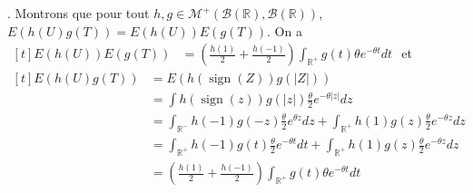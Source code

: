 \documentclass{report}
\DeclareMathOperator{\sign}{sign}
\begin{document}
\newline {}. Montrons que pour tout $h,g\in \mathcal M^+(\mathcal B(\mathbb R),\mathcal B(\mathbb R))$,  $E(h(U)g(T))=E(h(U))E(g(T))$.\newline
On a $\begin{aligned}[t]
E(h(U))E(g(T)) &= \left(\frac{h(1)}{2} + \frac{h(-1)}{2} \right) \int_{\mathbb R^+} g(t) \theta e^{-\theta t} dt
\end{aligned}$ \newline \newline
et $\begin{aligned}[t]
E(h(U)g(T)) &= E(h(\sign(Z))g(|Z|)) \\ 
&= \int h(\sign(z))g(|z|) \frac{\theta}{2}e^{-\theta |z|} dz \\
&= \int_{\mathbb R^-}h(-1)g(-z)\frac{\theta}{2}e^{\theta z} dz + \int_{\mathbb R^+}h(1)g(z)\frac{\theta}{2}e^{-\theta z} dz \\
&= \int_{\mathbb R^+}h(-1)g(t)\frac{\theta}{2}e^{-\theta t} dt + \int_{\mathbb R^+}h(1)g(z)\frac{\theta}{2}e^{-\theta z} dz \\
&= \left(\frac{h(1)}{2} + \frac{h(-1)}{2} \right) \int_{\mathbb R^+} g(t) \theta e^{-\theta t} dt
\end{aligned}$ 
\end{document}
